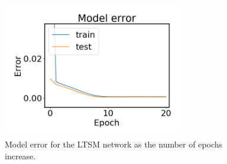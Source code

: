     
    \begin{figure}
        \centering
        \includegraphics[width=0.7\textwidth]{report/figures/analysis/plant2_train_long/lstm_model_errror.png}
        \caption{Model error for the LTSM network as the number of epochs increase.}
    \end{figure}
    
    
